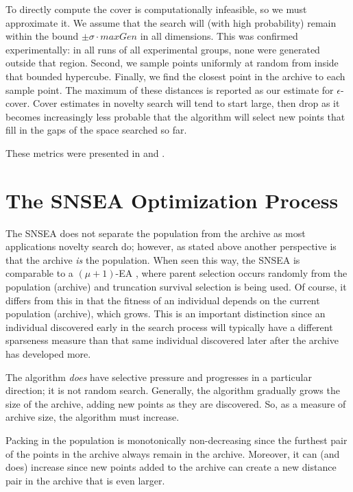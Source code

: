 \documentclass[twoside]{article}
\begin{document}
To directly compute the cover is computationally infeasible, so we must approximate it.  We assume that the search will (with high probability) remain within the bound $\pm\sigma\cdot maxGen$ in all dimensions.  This was confirmed experimentally:  in all runs of all experimental groups, none were generated outside that region.  Second, we sample points uniformly at random from inside that bounded hypercube.  Finally, we find the closest point in the archive to each sample point. The maximum of these distances is reported as our estimate for $\epsilon$-cover.  Cover estimates in novelty search will tend to start large, then drop as it becomes increasingly less probable that the algorithm will select new points that fill in the gaps of the space searched so far.

These metrics were presented in \citet{Wiegand2020flairs} and \citet{Wiegand2021flairs}.



\section{The SNSEA Optimization Process}
\label{sec:resultssnsea}

The SNSEA does not separate the population from the archive as most applications novelty search do; however, as stated above another perspective is that the archive \emph{is} the population.  When seen this way, the SNSEA is comparable to a $(\mu+1)$-EA \citep{ec:DeJong2006}, where parent selection occurs randomly from the population (archive) and truncation survival selection is being used.  Of course, it differs from this in that the fitness of an individual depends on the current population (archive), which grows.  This is an important distinction since an individual discovered early in the search process will typically have a different sparseness measure than that same individual discovered later after the archive has developed more.

The algorithm \emph{does} have selective pressure and progresses in a particular direction; it is not random search.  Generally, the algorithm gradually grows the size of the archive, adding new points as they are discovered.  So, as a measure of archive size, the algorithm must increase.

Packing in the population is monotonically non-decreasing since the furthest pair of the points in the archive always remain in the archive.  Moreover, it can (and does) increase since new points added to the archive can create a new distance pair in the archive that is even larger.
\end{document}
